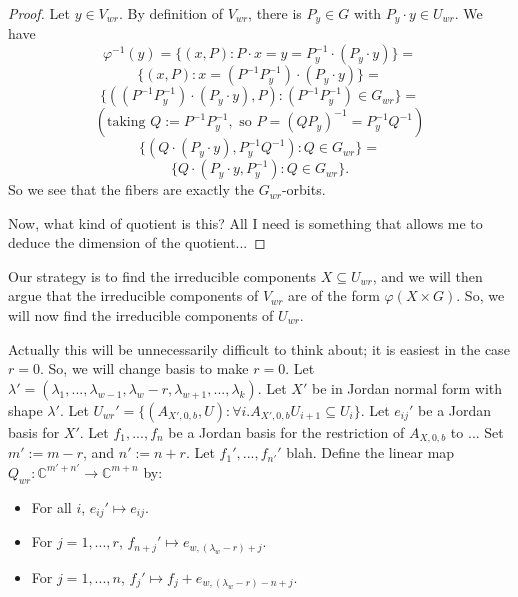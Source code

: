 \documentclass[12pt,psamsfonts]{article}
\begin{document}
\begin{proof}
    Let \(y \in V_{wr}\).
    By definition of \(V_{wr}\), there is \(P_y \in G\) with \(P_y \cdot y \in U_{wr}\).
    We have
    \[\varphi^{-1}(y) = \{(x, P) : P \cdot x = y = P_y^{-1} \cdot (P_y \cdot y)\} = \]
    \[\{(x, P) : x = (P^{-1} P_y^{-1}) \cdot (P_y \cdot y) \} = \]
    \[\{((P^{-1}P_y^{-1}) \cdot (P_y \cdot y), P) : (P^{-1} P_y^{-1}) \in G_{wr}\} = \] 
    \[(\textrm{taking } Q := P^{-1}P_y^{-1}, \textrm{ so } P = (QP_y)^{-1} = P_y^{-1} Q^{-1})\]
    \[\{(Q \cdot (P_y \cdot y), P_y^{-1} Q^{-1}) : Q \in G_{wr}\} = \]
    \[\{Q \cdot (P_y \cdot y, P_y^{-1}) : Q \in G_{wr}\}.\]
    So we see that the fibers are exactly the \(G_{wr}\)-orbits.
    \par Now, what kind of quotient is this?
    All I need is something that allows me to deduce the dimension of the quotient...
\end{proof}
Our strategy is to find the irreducible components \(X \subseteq U_{wr}\), and we will then argue that the irreducible components of \(V_{wr}\) are of the form \(\varphi(X \times G)\).
So, we will now find the irreducible components of \(U_{wr}\).
\par Actually this will be unnecessarily difficult to think about; it is easiest in the case \(r = 0\).
So, we will change basis to make \(r = 0\).
Let \(\lambda' = (\lambda_1, ..., \lambda_{w - 1}, \lambda_w - r, \lambda_{w + 1}, ..., \lambda_k)\).
Let \(X'\) be in Jordan normal form with shape \(\lambda'\).
Let \(U_{wr}' = \{(A_{X', 0, b}, U) : \forall i. A_{X', 0, b} U_{i + 1} \subseteq U_i\}\).
Let \(e_{ij}'\) be a Jordan basis for \(X'\).
Let \(f_1, ..., f_n\) be a Jordan basis for the restriction of \(A_{X, 0, b}\) to \(\mathbb{}\)...
Set \(m' := m - r\), and \(n' := n + r\).
Let \(f_1', ..., f_{n'}'\) blah.
Define the linear map \(Q_{wr} : \mathbb{C}^{m' + n'} \to \mathbb{C}^{m + n}\) by:
\begin{itemize}
    \item For all \(i\), \(e_{ij}' \mapsto e_{ij}\).
    \item For \(j = 1, ..., r\), \(f_{n + j}' \mapsto e_{w,(\lambda_w - r) + j}\).
    \item For \(j = 1, ..., n\), \(f_j' \mapsto f_j + e_{w, (\lambda_w - r) - n + j}\).
\end{itemize}
\end{document}
